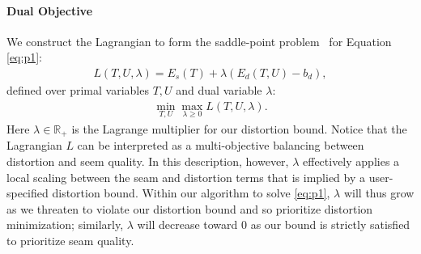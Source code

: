 %


\paragraph{Dual Objective}
We construct the Lagrangian to form the saddle-point problem~\cite{} for Equation \ref{eq:p1}:
\begin{align}
	L(T,U,\lambda) = E_s(T) + \lambda(E_d(T,U) - b_d),
	\label{eq:L}
\end{align}
%
defined over primal variables $T,U$ and dual variable $\lambda$:
%
\begin{align}
	\min_{T,U} \max_{\lambda\geq0} L(T,U,\lambda).
	\label{eq:p2}
\end{align}
%
Here $\lambda \in \mathbb{R_+}$ is the Lagrange multiplier for our distortion bound. Notice that the Lagrangian $L$ can be interpreted as a multi-objective balancing between distortion and seem quality. In this description, however, $\lambda$ effectively applies a local scaling between the seam and distortion terms that is implied %
by a user-specified distortion bound. Within our algorithm to solve \eqref{eq:p1}, $\lambda$ will thus grow as we threaten to violate our distortion bound and so prioritize distortion minimization; similarly, $\lambda$ will decrease toward $0$ as our bound is strictly satisfied to prioritize seam quality.


